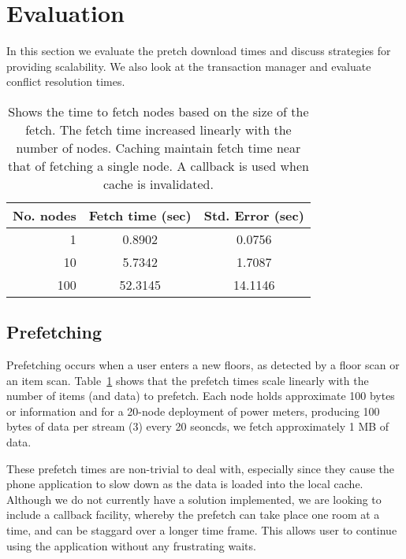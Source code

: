 \section{Evaluation}
\label{sec:eval}
In this section we evaluate the pretch download times and discuss strategies for providing scalability.  We also
look at the transaction manager and evaluate conflict resolution times.


\begin{table}
\begin{center}
  \begin{tabular}{| r | c  c | }
    \hline
    {\bf No. nodes } & {\bf Fetch time (sec) } & {\bf Std. Error (sec)} \\ \hline
    1 & 0.8902 & 0.0756 \\ \hline
    10 & 5.7342 & 1.7087 \\ \hline
    100 & 52.3145 & 14.1146 \\ 
    \hline
  \end{tabular}
\caption{Shows the time to fetch nodes based on the size of the fetch.  The fetch time
increased linearly with the number of nodes.  Caching maintain fetch time near
that of fetching a single node.  A callback is used when cache is invalidated.}
\label{tab:prefetchtimes}
\end{center}
\end{table}

\subsection{Prefetching}
Prefetching occurs when a user enters a new floors, as detected by a floor scan or an item
scan.  Table~\ref{tab:prefetchtimes} shows that the prefetch times scale linearly with the number of
items (and data) to prefetch.  Each node holds approximate 100 bytes or information and for
a 20-node deployment of power meters, producing 100 bytes of data per stream (3) every 20 seoncds, we fetch 
approximately 1 MB of data.

These prefetch times are non-trivial to deal with, especially since they cause the phone application to slow down
as the data is loaded into the local cache.  Although we do not currently have a solution implemented, we are
looking to include a callback facility, whereby the prefetch can take place one room at a time, and can be staggard over
a longer time frame.  This allows user to continue using the application without any frustrating waits.


